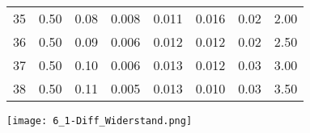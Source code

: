 \begin{center}
\begin{tabular}{gcccc|ccc}
        35 &     0.50 &         0.08 &     0.008 &         0.011 &  0.016 &      0.02 &  2.00 \\      
        36 &     0.50 &         0.09 &     0.006 &         0.012 &  0.012 &      0.02 &  2.50 \\      
        37 &     0.50 &         0.10 &     0.006 &         0.013 &  0.012 &      0.03 &  3.00 \\      
        38 &     0.50 &         0.11 &     0.005 &         0.013 &  0.010 &      0.03 &  3.50 \\
    \end{tabular}
\end{center}
\newpage
\begin{center}
    \texttt{[image: 6\_1-Diff\_Widerstand.png]}
\end{center}
\newpage